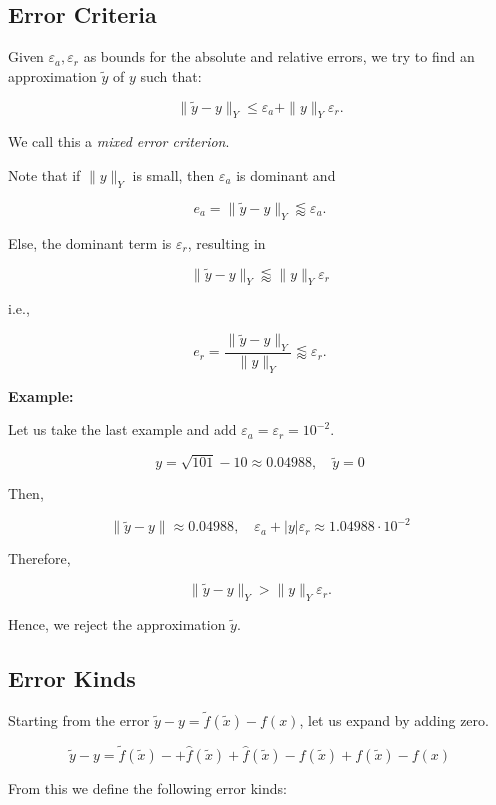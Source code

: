 \subsection{Error Criteria}

Given \(\varepsilon_a, \varepsilon_{r}\) as bounds for the absolute and relative errors, we try 
to find an approximation \(\tilde{y}\) of \(y\) such that: 

\[
    \|\tilde{y} - y \|_Y \le \varepsilon_a + \|y\|_Y \varepsilon_r.
\]

We call this a \emph{mixed error criterion}.

Note that if \(\|y\|_Y\) is small, then \(\varepsilon_a\) is dominant and 

\[
    e_a = \|\tilde{y} - y \|_Y \lessapprox \varepsilon_a.
\]

Else, the dominant term is \(\varepsilon_r\), resulting in

\[
    \|\tilde{y} - y \|_Y  \lessapprox \|y\|_Y \varepsilon_r 
\]

i.e., 

\[
    e_r = \frac{\|\tilde{y} - y \|_Y }{\|y\|_Y} \lessapprox \varepsilon_r.
\]

\textbf{Example:}

Let us take the last example and add \(\varepsilon_a = \varepsilon_r = 10^{-2}\). 

\[
    y = \sqrt{101} - 10 \approx 0.04988, \quad \tilde{y} = 0
\]

Then, 

\[
    \|\tilde{y} - y \| \approx 0.04988, \quad \varepsilon_a + |y|\varepsilon_r \approx 1.04988 \cdot 10^{-2}
\]

Therefore, 

\[
    \|\tilde{y} - y \|_Y  > \|y\|_Y \varepsilon_r.
\]

Hence, we reject the approximation \(\tilde{y}\). 

\subsection{Error Kinds}

Starting from the error \(\tilde{y} - y = \tilde{f}(\tilde{x}) - f(x)\), let us expand by adding zero. 

\[
    \tilde{y} - y = \tilde{f}(\tilde{x}) - + \hat{f}(\tilde{x}) + \hat{f}(\tilde{x}) - f(\tilde{x}) + f(\tilde{x}) - f(x)
\]

From this we define the following error kinds: 

